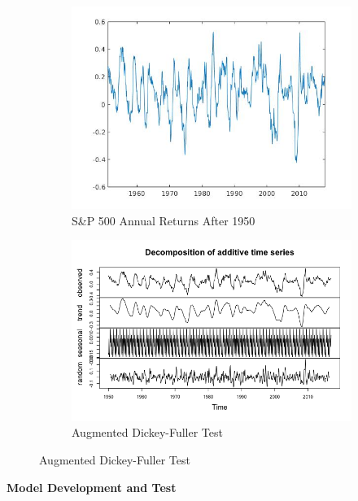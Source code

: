 \documentclass{article}
\begin{document}
\begin{figure}[H]
    \centering
    \begin{subfigure}{.5\textwidth}
        \centering
        \includegraphics[width=1\textwidth]{sp500-annual-increase.jpg}
        \caption{S\&P 500 Annual Returns After 1950}
        \label{fig:returns}
    \end{subfigure}%
    \begin{subfigure}{.5\textwidth}
        \centering
        \includegraphics[width=1\textwidth]{stationary-test.png}
        \caption{Augmented Dickey-Fuller Test}
        \label{fig:adf}
    \end{subfigure}
\end{figure}

\vspace{\baselineskip}
\textbf{Model Development and Test}
\end{document}
